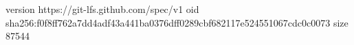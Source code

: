 version https://git-lfs.github.com/spec/v1
oid sha256:f0f8ff762a7dd4adf43a441ba0376dff0289cbf682117e524551067cdc0c0073
size 87544
